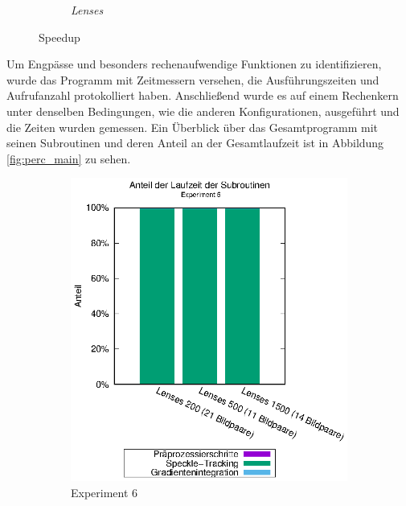 \begin{center}
\begin{figure}
\begin{subfigure}[b]{0.49\textwidth}
			\caption{\textit{Lenses}}
			\label{fig:speedup_lenses}
		\end{subfigure}
		\caption{Speedup}
		\label{fig:speedup}
	\end{figure}
\end{center}

Um Engpässe und besonders rechenaufwendige Funktionen zu identifizieren, wurde das Programm mit Zeitmessern versehen, die Ausführungszeiten und Aufrufanzahl protokolliert haben. Anschließend wurde es auf einem Rechenkern unter denselben Bedingungen, wie die anderen Konfigurationen, ausgeführt und die Zeiten wurden gemessen. Ein Überblick über das Gesamtprogramm mit seinen Subroutinen und deren Anteil an der Gesamtlaufzeit ist in Abbildung \ref{fig:perc_main} zu sehen.

\begin{center}
	\begin{figure}[htbp]
		\begin{subfigure}[b]{0.5\textwidth}
			\centering
			\includegraphics[width=\textwidth]{pdf/main_exp6}
			\caption{Experiment 6}
			\label{fig:perc_main_exp6}
		\end{subfigure}
		\begin{subfigure}[b]{0.5\textwidth}
			\centering

\end{subfigure}
\end{figure}
\end{center}

